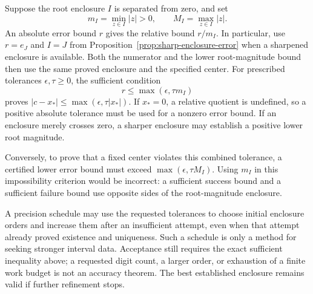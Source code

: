 Suppose the root enclosure $I$ is separated from zero, and set
\[
 m_I=\min_{z\in I}|z|>0,\qquad M_I=\max_{z\in I}|z|.
\]
An absolute error bound $r$ gives the relative bound $r/m_I$.
In particular, use $r=e_J$ and $I=J$ from
Proposition~\ref{prop:sharp-enclosure-error} when a sharpened enclosure is
available. Both the numerator and the lower root-magnitude bound then use
the same proved enclosure and the specified center.
For prescribed tolerances $\epsilon,\tau\ge0$, the sufficient condition
\[
 r\le\max(\epsilon,\tau m_I)
\]
proves $|c-x_*|\le\max(\epsilon,\tau|x_*|)$.
If $x_*=0$, a relative quotient is undefined, so a positive absolute
tolerance must be used for a nonzero error bound. If an enclosure merely
crosses zero, a sharper enclosure may establish a positive lower root
magnitude.

Conversely, to prove that a fixed center violates this combined tolerance,
a certified lower error bound must exceed $\max(\epsilon,\tau M_I)$.
Using $m_I$ in this impossibility criterion would be incorrect: a
sufficient success bound and a sufficient failure bound use opposite
sides of the root-magnitude enclosure.

A precision schedule may use the requested tolerances to choose initial
enclosure orders and increase them after an insufficient attempt, even when
that attempt already proved existence and uniqueness. Such a schedule is
only a method for seeking stronger interval data. Acceptance still requires
the exact sufficient inequality above; a requested digit count, a larger
order, or exhaustion of a finite work budget is not an accuracy theorem.
The best established enclosure remains valid if further refinement stops.
